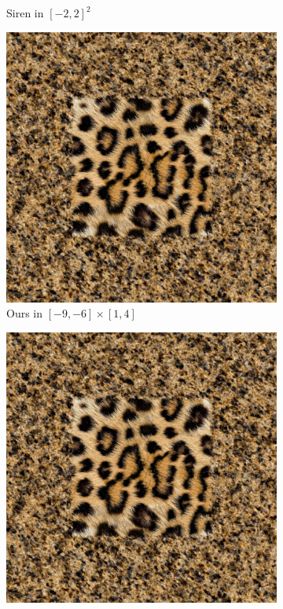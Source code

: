 \begin{figure}
\begin{subfigure}[b]{0.24\textwidth}
        \caption{Siren in $[-2, 2]^2$}
        \label{f:siren-leopard-regular}
    \end{subfigure}
    \begin{subfigure}[b]{0.24\textwidth}
        \centering
        \includegraphics[width=\textwidth]{img/ch6/siren_extrapolation.png}
        \caption{Ours in $[-9, -6] \times [1, 4]$}
        \label{f:periodic-leopard-translated}
    \end{subfigure}
    \begin{subfigure}[b]{0.24\textwidth}
        \centering
        \includegraphics[width=\textwidth]{img/ch6/siren_extrapolation.png}

\end{subfigure}
\end{figure}
